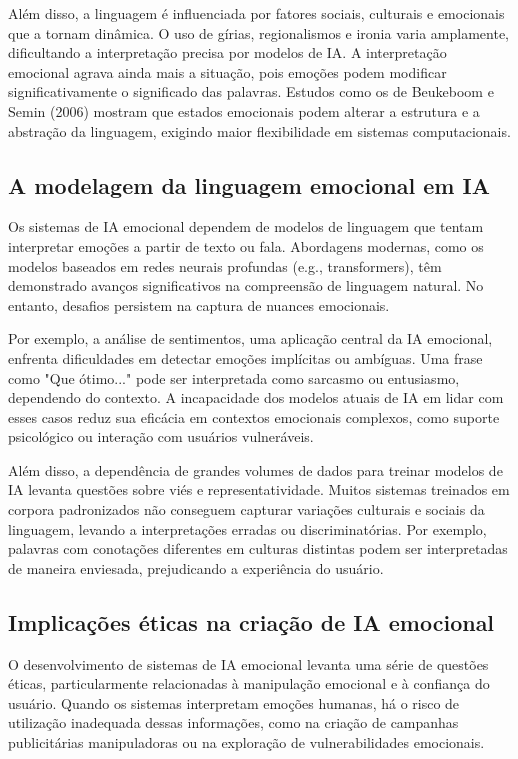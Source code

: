 \documentclass[a4paper,12pt]{report}
\begin{document}
	Além disso, a linguagem é influenciada por fatores sociais, culturais e emocionais que a tornam dinâmica. O uso de gírias, regionalismos e ironia varia amplamente, dificultando a interpretação precisa por modelos de IA. A interpretação emocional agrava ainda mais a situação, pois emoções podem modificar significativamente o significado das palavras. Estudos como os de Beukeboom e Semin (2006) mostram que estados emocionais podem alterar a estrutura e a abstração da linguagem, exigindo maior flexibilidade em sistemas computacionais.
	
	\subsection{A modelagem da linguagem emocional em IA}
	
	Os sistemas de IA emocional dependem de modelos de linguagem que tentam interpretar emoções a partir de texto ou fala. Abordagens modernas, como os modelos baseados em redes neurais profundas (e.g., transformers), têm demonstrado avanços significativos na compreensão de linguagem natural. No entanto, desafios persistem na captura de nuances emocionais.
	
	Por exemplo, a análise de sentimentos, uma aplicação central da IA emocional, enfrenta dificuldades em detectar emoções implícitas ou ambíguas. Uma frase como "Que ótimo..." pode ser interpretada como sarcasmo ou entusiasmo, dependendo do contexto. A incapacidade dos modelos atuais de IA em lidar com esses casos reduz sua eficácia em contextos emocionais complexos, como suporte psicológico ou interação com usuários vulneráveis.
	
	Além disso, a dependência de grandes volumes de dados para treinar modelos de IA levanta questões sobre viés e representatividade. Muitos sistemas treinados em corpora padronizados não conseguem capturar variações culturais e sociais da linguagem, levando a interpretações erradas ou discriminatórias. Por exemplo, palavras com conotações diferentes em culturas distintas podem ser interpretadas de maneira enviesada, prejudicando a experiência do usuário.
	
	\subsection{Implicações éticas na criação de IA emocional}
	
	O desenvolvimento de sistemas de IA emocional levanta uma série de questões éticas, particularmente relacionadas à manipulação emocional e à confiança do usuário. Quando os sistemas interpretam emoções humanas, há o risco de utilização inadequada dessas informações, como na criação de campanhas publicitárias manipuladoras ou na exploração de vulnerabilidades emocionais.
	
\end{document}
